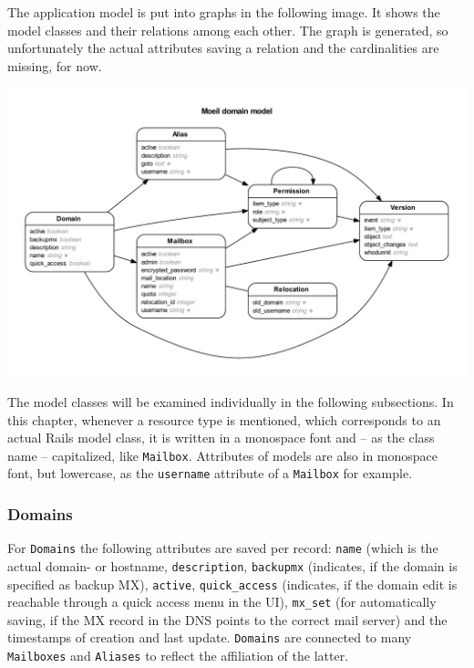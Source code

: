\documentclass[12pt,a4paper]{scrartcl}
\begin{document}
			The application model is put into graphs in the following image. It
			shows the model classes and their relations among each other. The
			graph is generated, so unfortunately the actual attributes saving a
			relation and the cardinalities are missing, for now.

			\includegraphics[width=\textwidth]{images/erd.pdf}

			\noindent
			The model classes will be examined individually in the following
			subsections. In this chapter, whenever a resource type is
			mentioned, which corresponds to an actual \ac{Rails} model class,
			it is written in a monospace font and -- as the class name --
			capitalized, like \texttt{Mailbox}. Attributes of models are also
			in monospace font, but lowercase, as the \texttt{username}
			attribute of a \texttt{Mailbox} for example.

			\subsubsection{Domains}
				For \texttt{Domains} the following attributes are saved per
				record: \texttt{name} (which is the actual domain- or hostname,
				\texttt{description}, \texttt{backupmx} (indicates, if the
				domain is specified as backup MX), \texttt{active},
				\texttt{quick\_access} (indicates, if the domain edit is
				reachable through a quick access menu in the \ac{UI}),
				\texttt{mx\_set} (for automatically saving, if the MX record in
				the DNS points to the correct mail server) and the timestamps
				of creation and last update. \texttt{Domains} are connected to
				many \texttt{Mailboxes} and \texttt{Aliases} to reflect the
				affiliation of the latter.
\end{document}
